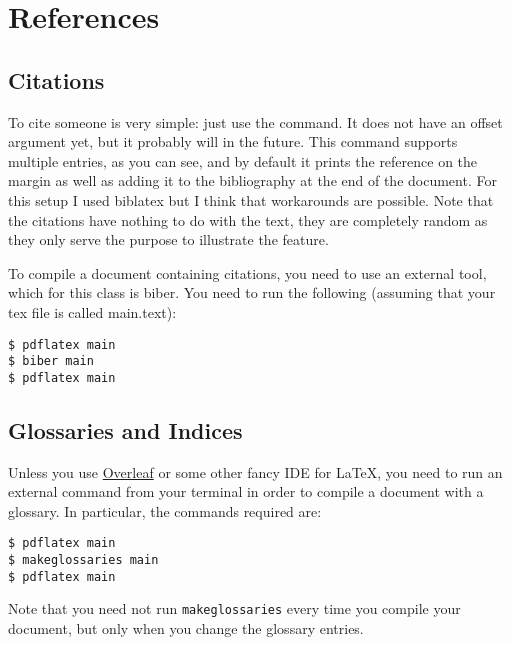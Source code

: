 \chapter{References}

\section{Citations}

To cite someone  is very simple: just 
use the  command. It does 
not have an offset argument yet, but it probably will in the future. 
This command supports multiple entries, as you can see, and by default 
it prints the reference on the margin as well as adding it to the 
bibliography at the end of the document. For this setup I used biblatex 
but I think that workarounds are possible. Note that 
the citations have nothing to do with the text, they are completely 
random as they only serve the purpose to illustrate the feature.

To compile a document containing citations, you need to use an external 
tool, which for this class is biber. You need to run the following 
(assuming that your tex file is called main.text):

\begin{lstlisting}[style=kaolstplain]
$ pdflatex main
$ biber main
$ pdflatex main
\end{lstlisting}

\section{Glossaries and Indices}



Unless you use \href{https://www.overleaf.com}{Overleaf} or some other 
fancy IDE for \LaTeX, you need to run an external command from your 
terminal in order to compile a document with a glossary. In particular, 
the commands required are:

\begin{lstlisting}[style=kaolstplain]
$ pdflatex main
$ makeglossaries main
$ pdflatex main
\end{lstlisting}

Note that you need not run \texttt{makeglossaries} every time you 
compile your document, but only when you change the glossary entries.

